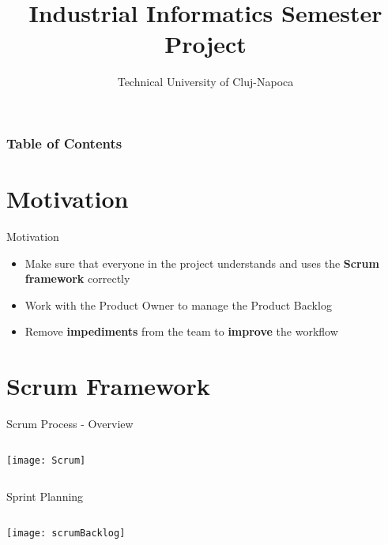 \documentclass{beamer}
\title{Industrial Informatics Semester Project}
\subtitle{Technical University of Cluj-Napoca}
\author[Technical University of Cluj-Napoca]{%
	\texorpdfstring{%
		\begin{columns}
			\column{.5\linewidth}
			\centering
			Achim Daniel \\ Băltărețu Teodor-Stelian \\ Bugnariu Vlad \\ Ciobotaru Alexandru
			\column{.5\linewidth}
			\centering
			Fildan Claudiu \\ Furdui Vasile Teodor \\ Gog Ionela-Maria
		\end{columns}
	}
	{Author 1, Author 2, Author 3}
}
\begin{document}
	\maketitle
	
    \begin{frame}
    	\frametitle{Table of Contents}
    	\tableofcontents
    \end{frame}	


\section{Motivation}

\begin{frame}{Motivation}
	\begin{itemize}
		\item Make sure that everyone in the project understands and uses the \textbf{Scrum framework} correctly
		\item Work with the Product Owner to manage the Product Backlog 
		\item Remove \textbf{impediments} from the team to \textbf{improve} the workflow
	\end{itemize}

\end{frame}



\section{Scrum Framework} %

\begin{frame}{Scrum Process - Overview}
	
\begin{columns}
	\centering
	\texttt{[image: Scrum]} 
\end{columns}

\end{frame}


\begin{frame}{Sprint Planning}

\begin{columns}
	\centering
	\texttt{[image: scrumBacklog]} 
\end{columns}

\end{frame}
\end{document}
